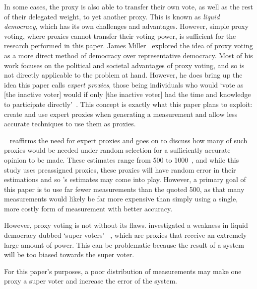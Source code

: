 In some cases, the proxy is also able to transfer their own vote, as well as the rest of
their delegated weight, to yet another proxy.
This is known as \textit{liquid democracy}, which has its own challenges and
advantages.
However, simple proxy voting, where proxies cannot transfer their voting power,
is sufficient for the research performed in this paper.
James Miller~\cite{Miller1969} explored the idea of proxy voting as a more
direct method of democracy over representative democracy.
Most of his work focuses on the political and societal advantages of proxy
voting, and so is not directly applicable to the problem at hand.
However, he does bring up the idea this paper calls \textit{expert proxies},
those being individuals who would `vote as [the inactive voter] would if only
[the inactive voter] had the time and knowledge to participate
directly'~\cite[para.~1.3]{Miller1969}.
This concept is exactly what this paper plans to exploit: create and use expert
proxies when generating a measurement and allow less accurate techniques to use
them as proxies.

~\cite{Mueller1972} reaffirms the need for expert proxies and
goes on to discuss how many of such proxies would be needed under random
selection for a sufficiently accurate opinion to be made.
These estimates range from 500 to 1000~\cite[para.~3.2]{Mueller1972}, and
while this study uses preassigned proxies, these proxies will have random
error in their estimations and so 's estimates may come into
play.
However, a primary goal of this paper is to use far fewer measurements than the
quoted 500, as that many measurements would likely be far more expensive than
simply using a single, more costly form of measurement with better accuracy.

However, proxy voting is not without its flaws.
 investigated a weakness in liquid democracy dubbed `super voters'
~\cite[para.~1.3]{Golz2021}, which are proxies that receive an extremely large
amount of power.
This can be problematic because the result of a system will be too biased
towards the super voter.  

For this paper's purposes, a poor distribution of measurements may make one
proxy a super voter and increase the error of the system.


